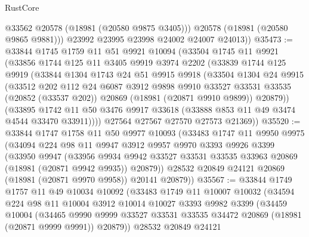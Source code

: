 \begin{lexlean}{RustCore}
\begin{coremodule}
            @33562
            @20578
            (@18981 (@20580 @9875 @3405)))
          @20578
          (@18981 (@20580 @9865 @9881)))
        @23992
        @23995
        @23998
        @24002
        @24007
        @24013))
@35473 := @33844
    @1745
    @1759
    @11
    @51
    @9921
    @10094
    (@33504
      @1745
      @11
      @9921
      (@33856
        @1744
        @125
        @11
        @3405
        @9919
        @3974
        @2202
        (@33839
          @1744
          @125
          @9919
          (@33844
            @1304
            @1743
            @24
            @51
            @9915
            @9918
            (@33504
              @1304
              @24
              @9915
              (@33512
                @202
                @112
                @24
                @6087
                @3912
                @9898
                @9910
                @33527
                @33531
                @33535
                (@20852 (@33537 @202))
                @20869
                (@18981 (@20871 @9910 @9899))
                @20879))
            (@33895
              @1742
              @11
              @50
              @3476
              @9917
              @33618
              (@33888 @853 @11 @49 @3474 @4544 @33470 @33911))))
        @27564
        @27567
        @27570
        @27573
        @21369))
@35520 := @33844
    @1747
    @1758
    @11
    @50
    @9977
    @10093
    (@33483
      @1747
      @11
      @9950
      @9975
      (@34094
        @224
        @98
        @11
        @9947
        @3912
        @9957
        @9970
        @3393
        @9926
        @3399
        (@33950
          @9947
          (@33956
            @9934
            @9942
            @33527
            @33531
            @33535
            @33963
            @20869
            (@18981 (@20871 @9942 @9935))
            @20879))
        @28532
        @20849
        @24121
        @20869
        (@18981 (@20871 @9970 @9958))
        @20141
        @20879))
@35567 := @33844
    @1749
    @1757
    @11
    @49
    @10034
    @10092
    (@33483
      @1749
      @11
      @10007
      @10032
      (@34594
        @224
        @98
        @11
        @10004
        @3912
        @10014
        @10027
        @3393
        @9982
        @3399
        (@34459
          @10004
          (@34465
            @9990
            @9999
            @33527
            @33531
            @33535
            @34472
            @20869
            (@18981 (@20871 @9999 @9991))
            @20879))
        @28532
        @20849
        @24121

\end{coremodule}
\end{lexlean}
